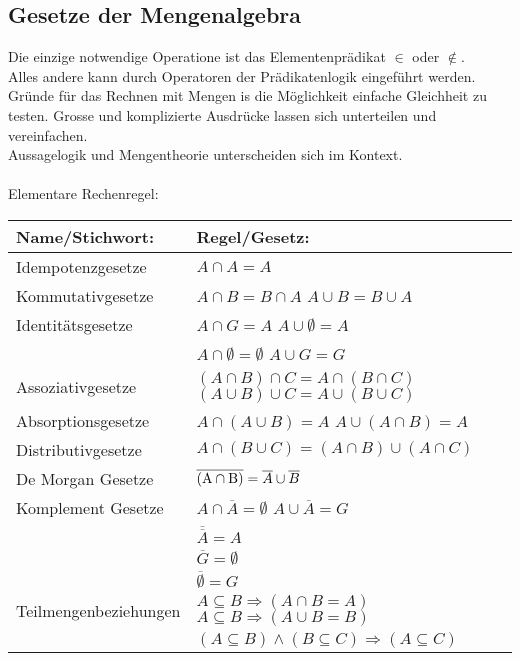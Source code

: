 \documentclass[../gruppenarbeit_1.tex]{subfiles}
\begin{document}
\subsection{Gesetze der Mengenalgebra}

Die einzige notwendige Operatione ist das Elementenprädikat $\in$ oder $\notin$.\\
Alles andere kann durch Operatoren der Prädikatenlogik eingeführt werden.\\
Gründe für das Rechnen mit Mengen is die Möglichkeit einfache Gleichheit zu testen. Grosse und komplizierte Ausdrücke lassen sich unterteilen und vereinfachen.\\
Aussagelogik und Mengentheorie unterscheiden sich im Kontext.\\
\\

Elementare Rechenregel:\\
\def\arraystretch{1.5}
\begin{table}[ht]
\begin{tabular}[t]{ll}
\hline
Name/Stichwort: & Regel/Gesetz:\\
\hline
  Idempotenzgesetze &
  $A \cap A = A$\\
  Kommutativgesetze &
  $A \cap B = B \cap A$ \hspace{31mm} $A \cup B = B \cup A$\\
  Identitätsgesetze &
  $A \cap G = A$ \hspace{37.5mm} $A \cup \emptyset = A$\\
  &
  $A \cap \emptyset = \emptyset$ \hspace{39mm} $A \cup G = G$\\
  Assoziativgesetze &
  $(A \cap B) \cap C = A \cap (B \cap C)$
  \hspace{11.5mm}
  $(A \cup B) \cup C = A \cup (B \cup C)$\\
  Absorptionsgesetze &
  $A \cap (A \cup B) = A$ \hspace{28mm} $A \cup (A \cap B) = A$\\
  Distributivgesetze &
  $A \cap (B \cup C) = (A \cap B) \cup ( A \cap C)$\\
  De Morgan Gesetze &
  $\overline{\rm (A \cap B)} = \overline{A} \cup \overline{B}$\\
  Komplement Gesetze &
  $A \cap \overline{A} = \emptyset$ \hspace{39mm} $A \cup \overline{A} = G$\\
  &
  $\overline{\overline{A}} = A$\\
  &
  $\overline{G} = \emptyset$\\
  &
  $\overline{\emptyset} = G$\\
  Teilmengenbeziehungen &
  $A \subseteq B \Rightarrow ( A \cap B = A)$ \hspace{20mm} $A \subseteq B \Rightarrow (A \cup B = B)$\\
  &
  $(A \subseteq B) \wedge (B \subseteq C) \Rightarrow (A \subseteq C)$\\
\hline
\end{tabular}
\end{table}
\end{document}

